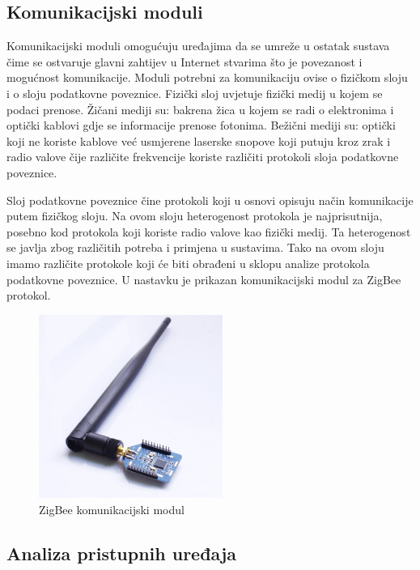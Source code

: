 \documentclass[times, utf8, diplomski]{fer}
\begin{document}
\subsection{Komunikacijski moduli}
Komunikacijski moduli omogućuju uređajima da se umreže u ostatak sustava čime se ostvaruje glavni zahtijev u Internet stvarima što je povezanost i mogućnost komunikacije. Moduli potrebni za komunikaciju ovise o fizičkom sloju i o sloju podatkovne poveznice. Fizički sloj uvjetuje fizički medij u kojem se podaci prenose. Žičani mediji su: bakrena žica u kojem se radi o elektronima i optički kablovi gdje se informacije prenose fotonima. Bežični mediji su: optički koji ne koriste kablove već usmjerene laserske snopove koji putuju kroz zrak i radio valove čije različite frekvencije koriste različiti protokoli sloja podatkovne poveznice. 

Sloj podatkovne poveznice čine protokoli koji u osnovi opisuju način komunikacije putem fizičkog sloju. Na ovom sloju heterogenost protokola je najprisutnija, posebno kod protokola koji koriste radio valove kao fizički medij. Ta heterogenost se javlja zbog različitih potreba i primjena u sustavima. Tako na ovom sloju imamo različite protokole koji će biti obrađeni u sklopu analize protokola podatkovne poveznice. U nastavku je prikazan komunikacijski modul za ZigBee protokol.
\begin{figure}[htb]
    \centering
    \includegraphics[width=6cm]{images/zigbee-module.jpg}
    \caption{ZigBee komunikacijski modul\citep{ZigBeemodule}}
    \label{fig:zigbeemodule}
\end{figure}

\subsection{Analiza pristupnih uređaja}
\end{document}
